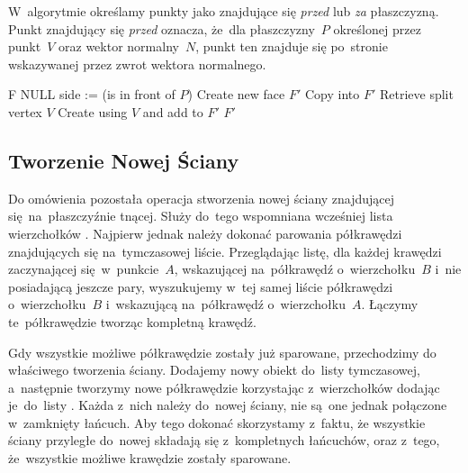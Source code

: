 \documentclass[skorowidz,autorrok,backref,xodstep,oswiadczenie]{wmimgr}
\begin{document}
W~algorytmie określamy punkty jako znajdujące się \emph{przed} lub \emph{za} płaszczyzną. Punkt znajdujący się \emph{przed} oznacza, że~dla płaszczyzny~$P$ określonej przez punkt~$V$ oraz wektor normalny~$N$, punkt ten znajduje się po~stronie wskazywanej przez zwrot wektora normalnego.

\begin{algorithm}
\caption{$CutFace(F, P)$}
\label{CutFace}
\begin{algorithmic}
        \RETURN F
    \ENDIF
        \RETURN NULL
    \ENDIF
    \STATE {}
    \STATE side := (is  in front of $P$)
    \STATE Create new face $F'$
    \REPEAT
            \STATE Copy  into $F'$
        \ENDIF
            \STATE Retrieve split vertex $V$
            \STATE Create  using $V$ and add to $F'$
            \STATE {}
        \ENDIF
        \STATE {}
    \RETURN $F'$
\end{algorithmic}
\end{algorithm}

\subsection{Tworzenie Nowej Ściany}

Do omówienia pozostała operacja stworzenia nowej ściany znajdującej się~na~płaszczyźnie tnącej. Służy do~tego wspomniana wcześniej lista wierzchołków . Najpierw jednak należy dokonać parowania półkrawędzi znajdujących się na~tymczasowej liście. Przeglądając listę, dla każdej krawędzi zaczynającej się~w~punkcie~$A$, wskazującej na~półkrawędź o~wierzchołku~$B$ i~nie posiadającą jeszcze pary, wyszukujemy w~tej samej liście półkrawędzi o~wierzchołku~$B$ i~wskazującą na~półkrawędź o~wierzchołku~$A$. Łączymy te~półkrawędzie tworząc kompletną krawędź.

Gdy wszystkie możliwe półkrawędzie zostały już sparowane, przechodzimy do właściwego tworzenia ściany. Dodajemy nowy obiekt  do~listy tymczasowej, a~następnie tworzymy nowe półkrawędzie korzystając z~wierzchołków  dodając je~do~listy . Każda z~nich należy do~nowej ściany, nie są~one jednak połączone w~zamknięty łańcuch. Aby tego dokonać skorzystamy z~faktu, że wszystkie ściany przyległe do~nowej składają się z~kompletnych łańcuchów, oraz z~tego, że~wszystkie możliwe krawędzie zostały sparowane.
\end{document}
